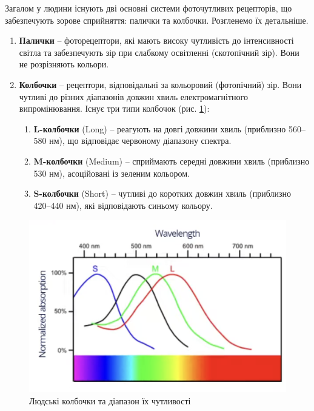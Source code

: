 \par
Загалом у людини існують дві основні системи фоточутливих рецепторів, що забезпечують зорове сприйняття: палички та колбочки. Розгленемо їх детальніше.
\begin{enumerate}
\item \textbf{Палички} -- фоторецептори, які мають високу чутливість до інтенсивності світла та забезпечують зір при слабкому освітленні 
(скотопічний зір). Вони не розрізняють кольори.
\item \textbf{Колбочки} -- рецептори, відповідальні за кольоровий (фотопічний) зір. Вони чутливі до різних діапазонів довжин хвиль електромагнітного 
випромінювання. Існує три типи колбочок (рис. \ref{fig:LightRecept}):
\begin{enumerate}
    \item \textbf{L-колбочки} (Long) -- реагують на довгі довжини хвиль (при\-близ\-но 560–580 нм), що відповідає червоному діапазону спектра.
    \item \textbf{M-колбочки} (Medium) -- сприймають середні довжини хвиль (при\-близ\-но 530 нм), асоційовані із зеленим кольором.
    \item \textbf{S-колбочки} (Short) -- чутливі до коротких довжин хвиль (при\-близ\-но 420–440 нм), які відповідають синьому кольору.
\end{enumerate}
\end{enumerate}

 \begin{figure}[h]
  \centering
  \includegraphics[scale=1]{Pictures/LightRecept.png}
  \caption{Людські колбочки та діапазон їх чутливості}
  \label{fig:LightRecept}
\end{figure}

